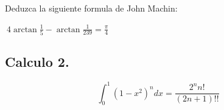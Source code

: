 \documentclass{article}
\theoremstyle{mytheoremstyle}
\theoremstyle{mytheoremstyle}
\theoremstyle{myproblemstyle}
\begin{document}
\begin{problem}

Deduzca la siguiente formula de John Machin:

\begin{center}

    $\displaystyle\ 4\arctan{\frac{1}{5}} - \arctan{\frac{1}{239}} = \frac{\pi}{4}  $

\end{center}


\end{problem}

\newpage


\subsection{Calculo 2.}
\smallskip
\begin{problem}


\[\int_{0}^{1}(1-x^2)^n dx = \frac{2^{n}{n!}}{(2n+1)!!}\]

\end{problem}
\end{document}
